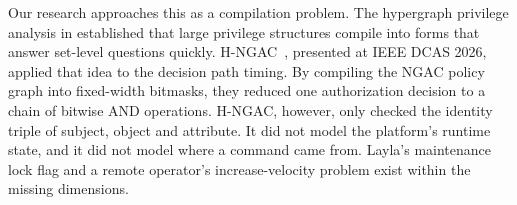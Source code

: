 \documentclass[conference]{IEEEtran}
\begin{document}
Our research approaches this as a compilation problem. The hypergraph privilege analysis in \cite{sitharaman2025hypergraph} established that large privilege structures compile into forms that answer set-level questions quickly. %
H-NGAC~\cite{karim2026dcas}, presented at IEEE DCAS 2026, applied that idea to the decision path timing. By compiling the NGAC policy graph \cite{incits565, ferraiolo2011policymachine} into fixed-width bitmasks, they reduced one authorization decision to a chain of bitwise AND operations. H-NGAC, however, only checked the identity triple of subject, object and attribute. It did not model the platform's runtime state, and it did not model where a command came from. Layla's maintenance lock flag and a remote operator's increase-velocity problem exist within the missing dimensions.
\end{document}
